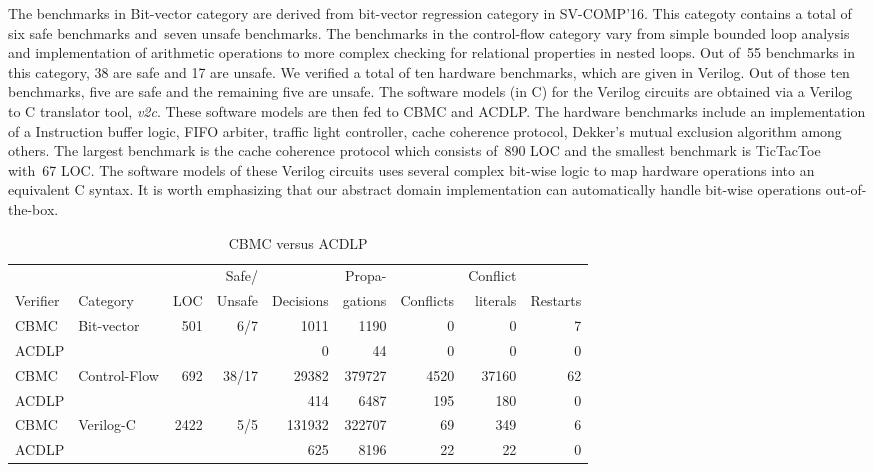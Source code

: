 The benchmarks in Bit-vector category are derived from bit-vector regression
category in SV-COMP'16.  This categoty contains a total of six safe
benchmarks and~seven unsafe benchmarks.  The benchmarks in the control-flow
category vary from simple bounded loop analysis and implementation of
arithmetic operations to more complex checking for relational properties in
nested loops.  Out of~55 benchmarks in this category, 38 are safe and 17 are
unsafe.  We verified a total of ten hardware benchmarks, which are given in
Verilog.  Out of those ten benchmarks, five are safe and the remaining five
are unsafe.  The software models (in C) for the Verilog circuits are
obtained via a Verilog to C translator tool, {\em v2c}.  These software
models are then fed to CBMC and ACDLP.  The hardware benchmarks include an
implementation of a Instruction buffer logic, FIFO arbiter, traffic light
controller, cache coherence protocol, Dekker's mutual exclusion algorithm
among others.  The largest benchmark is the cache coherence protocol which
consists of~890 LOC and the smallest benchmark is TicTacToe with~67 LOC. 
The software models of these Verilog circuits uses several complex bit-wise
logic to map hardware operations into an equivalent C syntax.  It is worth
emphasizing that our abstract domain implementation can automatically handle
bit-wise operations out-of-the-box.
%
\begin{table}[!b]
\begin{center}
{
\begin{tabular}{l|l|r|r|r|r|r|r|r}
\hline
           &          &     & Safe/  &           & Propa-  &           & Conflict &          \\
  Verifier & Category & LOC & Unsafe & Decisions & gations & Conflicts & literals & Restarts \\ \hline
  CBMC & \multirow{2}{*}{Bit-vector} & \multirow{2}{*}{501} &
  \multirow{2}{*}{6/7} & 1011 & 1190 & 0 & 0 & 7 \\
  ACDLP & & & & 0 & 44 & 0 & 0 & 0 \\ \hline
  CBMC & \multirow{2}{*}{Control-Flow} & \multirow{2}{*}{692} & 
  \multirow{2}{*}{38/17} & 29382 & 379727 & 4520 & 37160 & 62 \\ 
  ACDLP & & & & 414 & 6487 & 195 & 180 & 0  \\ \hline
  CBMC & \multirow{2}{*}{Verilog-C} & \multirow{2}{*}{2422} & 
  \multirow{2}{*}{5/5} & 131932 & 322707 & 69 & 349 & 6 \\ 
  ACDLP & & & & 625 & 8196 & 22 & 22 & 0 \\ \hline
\end{tabular}
}
\end{center}
\caption{CBMC versus ACDLP}
\label{detailed_result}
\end{table}
